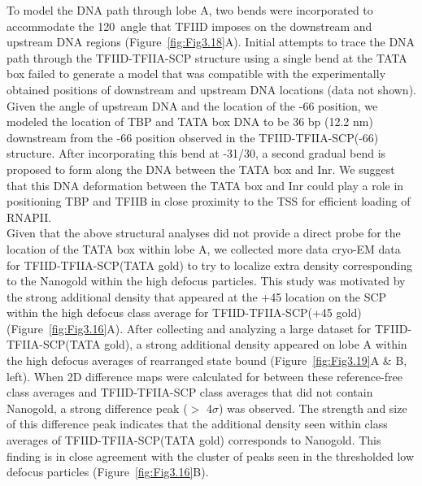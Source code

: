 \indent To model the DNA path through lobe A, two bends were incorporated to accommodate the 120\textdegree\ angle that TFIID imposes on the downstream and upstream DNA regions (Figure~\ref{fig:Fig3.18}A). Initial attempts to trace the DNA path through the TFIID-TFIIA-SCP structure using a single bend at the TATA box failed to generate a model that was compatible with the experimentally obtained positions of downstream and upstream DNA locations (data not shown). Given the angle of upstream DNA and the location of the -66 position, we modeled the location of TBP and TATA box DNA to be 36 bp (12.2 nm) downstream from the -66 position observed in the TFIID-TFIIA-SCP(-66) structure. After incorporating this bend at -31/30, a second gradual bend is proposed to form along the DNA between the TATA box and Inr. We suggest that this DNA deformation between the TATA box and Inr could play a role in positioning TBP and TFIIB in close proximity to the TSS for efficient loading of RNAPII. \\
\indent Given that the above structural analyses did not provide a direct probe for the location of the TATA box within lobe A, we collected more data cryo-EM data for TFIID-TFIIA-SCP(TATA gold) to try to localize extra density corresponding to the Nanogold within the high defocus particles. This study was motivated by the strong additional density that appeared at the +45 location on the SCP within the high defocus class average for TFIID-TFIIA-SCP(+45 gold) (Figure~\ref{fig:Fig3.16}A). After collecting and analyzing a large dataset for TFIID-TFIIA-SCP(TATA gold), a strong additional density appeared on lobe A within the high defocus averages of rearranged state bound (Figure~\ref{fig:Fig3.19}A \& B, left). When 2D difference maps were calculated for between these reference-free class averages and TFIID-TFIIA-SCP class averages that did not contain Nanogold, a strong difference peak ($>$ 4$\sigma$) was observed. The strength and size of this difference peak indicates that the additional density seen within class averages of TFIID-TFIIA-SCP(TATA gold) corresponds to Nanogold. This finding is in close agreement with the cluster of peaks seen in the thresholded low defocus particles (Figure~\ref{fig:Fig3.16}B).\\ 
